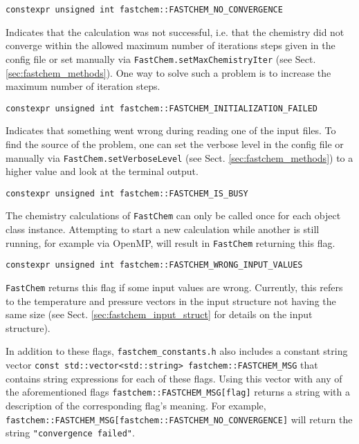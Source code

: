 \documentclass[numbers=noenddot]{aux/fcmanual}
\newcommand{\fc}{\texttt{FastChem}\xspace}
\begin{document}
\bigbreak

\lstinline!constexpr unsigned int fastchem::FASTCHEM_NO_CONVERGENCE!
\begin{addmargin}[25pt]{0pt}
  Indicates that the calculation was not successful, i.e. that the chemistry did not converge within the allowed maximum number of iterations steps given in the config file or set manually via \lstinline!FastChem.setMaxChemistryIter! (see Sect. \ref{sec:fastchem_methods}). One way to solve such a problem is to increase the maximum number of iteration steps.
\end{addmargin}

\bigbreak

\lstinline!constexpr unsigned int fastchem::FASTCHEM_INITIALIZATION_FAILED!
\begin{addmargin}[25pt]{0pt}
  Indicates that something went wrong during reading one of the input files. To find the source of the problem, one can set the verbose level in the config file or manually via \lstinline!FastChem.setVerboseLevel! (see Sect. \ref{sec:fastchem_methods}) to a higher value and look at the terminal output.
\end{addmargin}

\bigbreak

\lstinline!constexpr unsigned int fastchem::FASTCHEM_IS_BUSY!
\begin{addmargin}[25pt]{0pt}
  The chemistry calculations of \fc can only be called once for each object class instance. Attempting to start a new calculation while another is still running, for example via OpenMP, will result in \fc returning this flag.
\end{addmargin}

\bigbreak

\lstinline!constexpr unsigned int fastchem::FASTCHEM_WRONG_INPUT_VALUES!
\begin{addmargin}[25pt]{0pt}
  \fc returns this flag if some input values are wrong. Currently, this refers to the temperature and pressure vectors in the input structure not having the same size (see Sect. \ref{sec:fastchem_input_struct} for details on the input structure). \\
\end{addmargin}

In addition to these flags, \verb|fastchem_constants.h| also includes a constant string vector \lstinline!const std::vector<std::string> fastchem::FASTCHEM_MSG! that contains string expressions for each of these flags. Using this vector with any of the aforementioned flags \lstinline!fastchem::FASTCHEM_MSG[flag]! returns a string with a description of the corresponding flag's meaning. For example, \lstinline!fastchem::FASTCHEM_MSG[fastchem::FASTCHEM_NO_CONVERGENCE]! will return the string \lstinline!"convergence failed"!.
\end{document}
